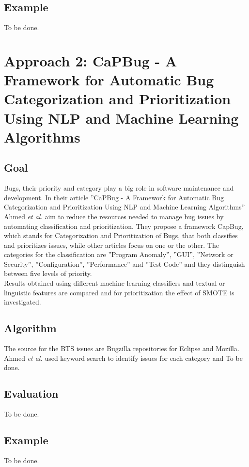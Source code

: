 \subsection{Example}
To be done.

\section{Approach 2: CaPBug - A Framework for Automatic Bug Categorization and Prioritization Using NLP and Machine Learning Algorithms}

\subsection{Goal}
Bugs, their priority and category play a big role in software maintenance and development. In their article  ''CaPBug - A Framework for Automatic Bug Categorization and Prioritization Using NLP and Machine Learning Algorithms'' Ahmed \textit{et al.} aim to reduce the resources needed to manage bug issues by automating classification and prioritization. They propose a framework CapBug, which stands for Categorization and Prioritization of Bugs, that both classifies and prioritizes issues, while other articles focus on one or the other. The categories for the classification are ''Program Anomaly'', ''GUI'', ''Network or Security'', ''Configuration'', ''Performance'' and ''Test Code'' and they distinguish between five levels of priority.\\
Results obtained using different machine learning classifiers and textual or linguistic features are compared and for prioritization the effect of SMOTE is investigated.

\subsection{Algorithm}
The source for the BTS issues are Bugzilla repositories for Eclipse and Mozilla. Ahmed \textit{et al.} used keyword search to identify issues for each category and 
To be done.

\subsection{Evaluation}
To be done.

\subsection{Example}
To be done.

